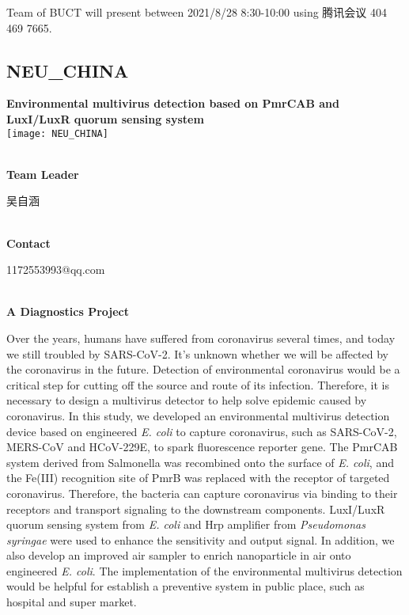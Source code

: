 \vfill{}









Team of BUCT will present between    2021/8/28 8:30-10:00     using 腾讯会议 404 469 7665.
\newpage


\subsection{\textcolor{Blu}{ NEU\_CHINA } }
\vspace{5mm}
\begin{center}
\large{
  \textbf{ Environmental multivirus detection based on PmrCAB and LuxI/LuxR quorum sensing system }\\

  \texttt{[image: NEU\_CHINA]}
}
\end{center}
\textbf{\\Team Leader}

  吴自涵


\textbf{\\Contact}

  1172553993@qq.com


\textbf{\\A Diagnostics Project\\}\begin{spacing}{1.5}

Over the years, humans have suffered from coronavirus several times, and today we still troubled by SARS-CoV-2. It’s unknown whether we will be affected by the coronavirus in the future. Detection of environmental coronavirus would be a critical step for cutting off the source and route of its infection. Therefore, it is necessary to design a multivirus detector to help solve epidemic caused by coronavirus. In this study, we developed an environmental multivirus detection device based on engineered \textit{E. coli} to capture coronavirus, such as SARS-CoV-2, MERS-CoV and HCoV-229E, to spark fluorescence reporter gene. The PmrCAB system derived from Salmonella was recombined onto the surface of \textit{E. coli}, and the Fe(III) recognition site of PmrB was replaced with the receptor of targeted coronavirus. Therefore, the bacteria can capture coronavirus via binding to their receptors and transport signaling to the downstream components. LuxI/LuxR quorum sensing system from \textit{E. coli} and Hrp amplifier from \textit{Pseudomonas syringae} were used to enhance the sensitivity and output signal. In addition, we also develop an improved air sampler to enrich nanoparticle in air onto engineered \textit{E. coli}. The implementation of the environmental multivirus detection would be helpful for establish a preventive system in public place, such as hospital and super market.\end{spacing}
\\

